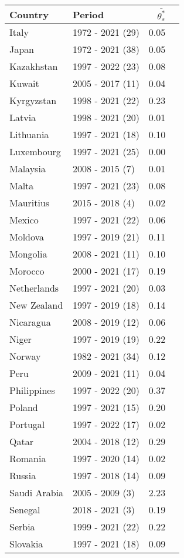 \begin{table}[H]
{{\centering
\begin{tabular}{llrr}
\toprule
Country & Period & $\overline{\theta_s^*}$\\
\midrule
Italy & 1972 - 2021 (29) & 0.05\\
Japan & 1972 - 2021 (38) & 0.05\\
Kazakhstan & 1997 - 2022 (23) & 0.08\\
Kuwait & 2005 - 2017 (11) & 0.04\\
Kyrgyzstan & 1998 - 2021 (22) & 0.23\\
\addlinespace
Latvia & 1998 - 2021 (20) & 0.01\\
Lithuania & 1997 - 2021 (18) & 0.10\\
Luxembourg & 1997 - 2021 (25) & 0.00\\
Malaysia & 2008 - 2015 (7) & 0.01\\
Malta & 1997 - 2021 (23) & 0.08\\
\addlinespace
Mauritius & 2015 - 2018 (4) & 0.02\\
Mexico & 1997 - 2021 (22) & 0.06\\
Moldova & 1997 - 2019 (21) & 0.11\\
Mongolia & 2008 - 2021 (11) & 0.10\\
Morocco & 2000 - 2021 (17) & 0.19\\
\addlinespace
Netherlands & 1997 - 2021 (20) & 0.03\\
New Zealand & 1997 - 2019 (18) & 0.14\\
Nicaragua & 2008 - 2019 (12) & 0.06\\
Niger & 1997 - 2019 (19) & 0.22\\
Norway & 1982 - 2021 (34) & 0.12\\
\addlinespace
Peru & 2009 - 2021 (11) & 0.04\\
Philippines & 1997 - 2022 (20) & 0.37\\
Poland & 1997 - 2021 (15) & 0.20\\
Portugal & 1997 - 2022 (17) & 0.02\\
Qatar & 2004 - 2018 (12) & 0.29\\
\addlinespace
Romania & 1997 - 2020 (14) & 0.02\\
Russia & 1997 - 2018 (14) & 0.09\\
Saudi Arabia & 2005 - 2009 (3) & 2.23\\
Senegal & 2018 - 2021 (3) & 0.19\\
Serbia & 1999 - 2021 (22) & 0.22\\
\addlinespace
Slovakia & 1997 - 2021 (18) & 0.09\\

\end{tabular}}}
\end{table}
